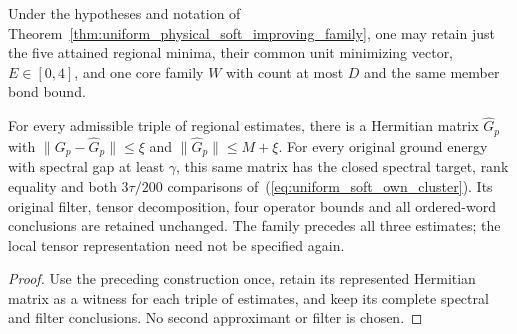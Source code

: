 \begin{lemma}
    \label{lem:uniform_physical_soft_filter_family}
    \leanok
    Under the hypotheses and notation of
    Theorem~\ref{thm:uniform_physical_soft_improving_family}, one may
    retain just the five attained regional minima, their common unit
    minimizing vector, $E\in[0,4]$, and one core family $W$ with count
    at most $D$ and the same member bond bound.

    For every admissible triple of regional estimates, there is a
    Hermitian matrix $\widehat G_p$ with
    $\|G_p-\widehat G_p\|\le\xi$ and
    $\|\widehat G_p\|\le M+\xi$. For every original ground energy
    with spectral gap at least $\gamma$, this same matrix has the
    closed spectral target, rank equality and both $3\tau/200$
    comparisons of~(\ref{eq:uniform_soft_own_cluster}). Its original
    filter, tensor decomposition, four operator bounds and all
    ordered-word conclusions are retained unchanged.
    The family precedes all three estimates; the local tensor
    representation need not be specified again.
\end{lemma}
\begin{proof}\leanok
    Use the preceding construction once, retain its represented
    Hermitian matrix as a witness for each triple of estimates, and
    keep its complete spectral and filter conclusions. No second
    approximant or filter is chosen.
\end{proof}

